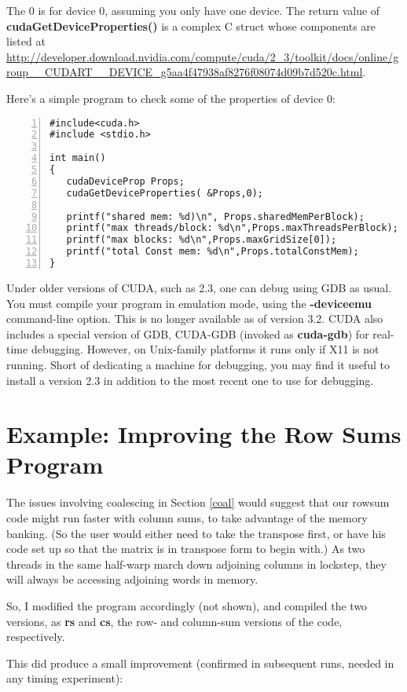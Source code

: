 The 0 is for device 0, assuming you only have one device.  The return
value of {\bf cudaGetDeviceProperties()} is a complex C struct
whose components are listed at
\url{http://developer.download.nvidia.com/compute/cuda/2_3/toolkit/docs/online/group__CUDART__DEVICE_g5aa4f47938af8276f08074d09b7d520c.html}.

Here's a simple program to check some of the properties of device 0:

\begin{lstlisting}[numbers=left]
#include<cuda.h>
#include <stdio.h>

int main()
{
   cudaDeviceProp Props;
   cudaGetDeviceProperties( &Props,0);

   printf("shared mem: %d)\n", Props.sharedMemPerBlock);
   printf("max threads/block: %d\n",Props.maxThreadsPerBlock);
   printf("max blocks: %d\n",Props.maxGridSize[0]);
   printf("total Const mem: %d\n",Props.totalConstMem);
}
\end{lstlisting}

Under older versions of CUDA, such as 2.3, one can debug using GDB as
usual.  You must compile your program in emulation mode, using the {\bf
-deviceemu} command-line option.  This is no longer available as of
version 3.2.  CUDA also includes a special version of GDB, CUDA-GDB
(invoked as {\bf cuda-gdb}) for real-time debugging.  However, on
Unix-family platforms it runs only if X11 is not running.  Short of
dedicating a machine for debugging, you may find it useful to install a
version 2.3 in addition to the most recent one to use for debugging.

\section{Example:  Improving the Row Sums Program}

The issues involving coalescing in Section \ref{coal} would suggest that
our rowsum code might run faster with column sums, to take advantage of
the memory banking.  (So the user would either need to take the
transpose first, or have his code set up so that the matrix is in
transpose form to begin with.) As two threads in the same half-warp
march down adjoining columns in lockstep, they will always be accessing
adjoining words in memory.  

So, I modified the program accordingly (not shown), and compiled the two
versions, as {\bf rs} and {\bf cs}, the row- and column-sum versions of
the code, respectively.

This did produce a small improvement (confirmed in subsequent runs,
needed in any timing experiment):

